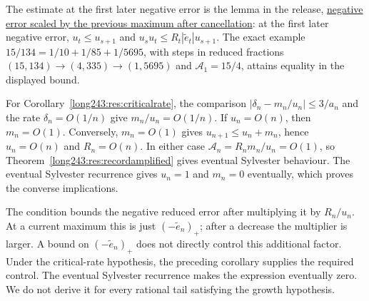 \documentclass[11pt]{article}
\begin{document}
The estimate at the first later negative error is the lemma in the release,
\href{https://github.com/wcook04/plectis-erdos-lean/blob/52f29ad173b04e3bac941b3663f2b9aebe5de0bb/ErdosProblems/Erdos243/SaturatedSquareTransport.lean\#L378}{negative error scaled by the previous maximum after cancellation}: at the first later negative error,
$u_t\le u_{s+1}$ and $u_su_t\le R_t|\tilde e_t|u_{s+1}$. The exact example
$15/134=1/10+1/85+1/5695$, with steps in reduced fractions
$(15,134)\to(4,335)\to(1,5695)$ and $\mathcal A_1=15/4$,
attains equality in the displayed bound.

For Corollary~\ref{long243:res:criticalrate}, the comparison
$|\delta_n-m_n/u_n|\le3/a_n$ and the rate $\delta_n=O(1/n)$ give
$m_n/u_n=O(1/n)$. If $u_n=O(n)$, then $m_n=O(1)$. Conversely,
$m_n=O(1)$ gives $u_{n+1}\le u_n+m_n$, hence $u_n=O(n)$ and
$R_n=O(n)$. In either case
$\mathcal A_n=R_nm_n/u_n=O(1)$, so
Theorem~\ref{long243:res:recordamplified} gives eventual Sylvester
behaviour. The eventual Sylvester recurrence gives $u_n=1$ and $m_n=0$ eventually,
which proves the converse implications.

The condition bounds the negative reduced error after multiplying it by
$R_n/u_n$. At a current maximum this is just $(-\tilde e_n)_+$; after a
decrease the multiplier is larger. A bound on $(-\tilde e_n)_+$ does
not directly control this additional factor. Under the critical-rate
hypothesis, the preceding corollary supplies the required control.
The eventual Sylvester recurrence makes the expression eventually zero.
We do not derive it for every rational tail satisfying the growth hypothesis.
\end{document}
